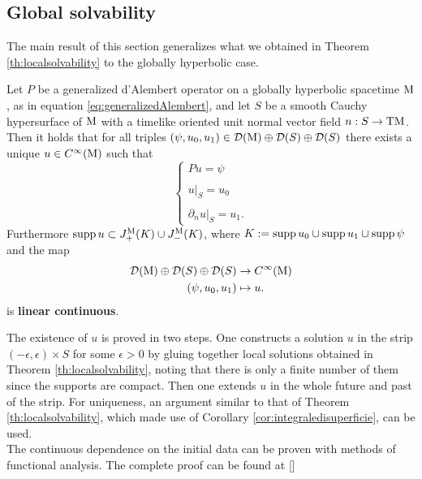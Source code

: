 \subsection{Global solvability}

The main result of this section generalizes what we obtained in Theorem \ref{th:localsolvability} to the globally hyperbolic case.

\begin{theorem}
	Let $P$ be a generalized d'Alembert operator on a globally hyperbolic spacetime $\mathrm{M}$, as in equation \eqref{eq:generalizedAlembert}, and let $S$ be a smooth Cauchy hypersurface of $\mathrm{M}$ with a timelike oriented unit normal vector field $n:S\to\mathrm{T}\mathrm{M}$.\\
	Then it holds that for all triples $(\psi,u_0,u_1)\in\mathcal{D}(\mathrm{M})\oplus\mathcal{D}(S)\oplus\mathcal{D}(S)$ there exists a unique $u\in C^\infty(\mathrm{M})$ such that
	\begin{equation}
	\begin{cases}
	P u=\psi\\
	\\
	u|_S=u_0\\
	\\
	\partial_n u|_S=u_1.
	\end{cases}
	\end{equation}
	Furthermore $\text{supp}\,u\subset J_+^{\mathrm{M}}(K)\cup J_-^{\mathrm{M}}(K)$, where $K:=\text{supp}\, u_0\cup\text{supp}\,u_1\cup\text{supp}\,\psi$ and the map
	\begin{equation*}
	\begin{aligned}
	\mathcal{D}(\mathrm{M})\oplus\mathcal{D}(S)\oplus\mathcal{D}(S)&\to C^{\infty}(\mathrm{M})\\
	(\psi,u_0,u_1)&\mapsto u.
	\end{aligned}
	\end{equation*}
	is \textbf{linear continuous}.
\end{theorem}
\Proofsketch The existence of $u$ is proved in two steps. One constructs a solution $u$ in the strip $(-\epsilon,\epsilon)\times S$ for some $\epsilon>0$ by gluing together local solutions obtained in Theorem \ref{th:localsolvability}, noting that there is only a finite number of them since the supports are compact. Then one extends $u$ in the whole future and past of the strip. For uniqueness, an argument similar to that of Theorem \ref{th:localsolvability}, which made use of Corollary \ref{cor:integraledisuperficie}, can be used.\\
The continuous dependence on the initial data can be proven with methods of functional analysis. The complete proof can be found at [\citealp[Th. 3.2.9]{bar2}]\endproof\\

